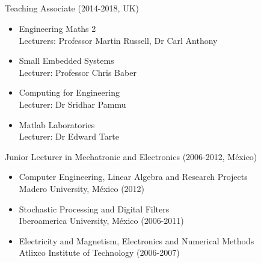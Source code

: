\subsection{}
{
\begin{frame}{}

\small 

Teaching Associate (2014-2018, UK)
\begin{itemize}
	\item Engineering Maths 2 \\ 
	Lecturers: Professor Martin Russell, Dr Carl Anthony
	\item Small Embedded Systems \\
	Lecturer: Professor Chris Baber
	\item Computing for Engineering \\
	Lecturer: Dr Sridhar Pammu 
	\item Matlab Laboratories \\
	Lecturer: Dr Edward Tarte
\end{itemize}



Junior Lecturer in Mechatronic and Electronics (2006-2012, M\'exico)
\begin{itemize}	
	\item Computer Engineering, Linear Algebra and Research Projects \\
	Madero University, M\'exico (2012)
	\item Stochastic Processing and Digital Filters \\
	Iberoamerica University, M\'exico (2006-2011)
	\item Electricity and Magnetism, Electronics and Numerical Methods \\
	Atlixco Institute of Technology (2006-2007)
\end{itemize}



\end{frame}
}



\subsection{}
{
\begin{frame}{}


    \begin{figure}
   \end{figure}



\end{frame}
}



